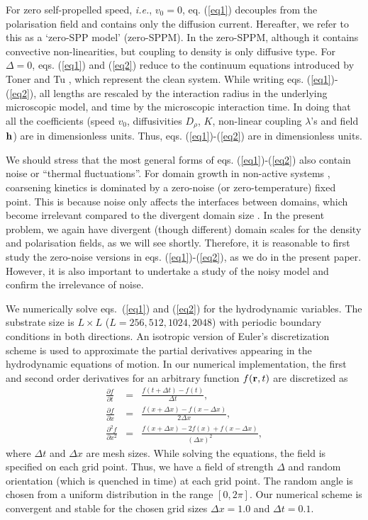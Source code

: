 \documentclass[pre,twocolumn,amssymb,showpacs,superscriptaddress,notitlepage]{revtex4-1}
\begin{document}
For zero self-propelled speed, {\it i.e.}, $v_0=0$, eq. (\ref{eq1}) decouples from the  polarisation field and 
contains only the diffusion current. Hereafter, we refer to this as a  `zero-SPP model' (zero-SPPM). In the zero-SPPM, 
although it contains convective non-linearities, but coupling to density is only diffusive type. 
For $\Delta=0$, eqs. (\ref{eq1}) and (\ref{eq2}) reduce to the continuum equations introduced by Toner and Tu \cite{tonertu}, 
which represent the clean system.  While writing eqs. (\ref{eq1})-(\ref{eq2}), all lengths are rescaled by the interaction 
radius in the underlying microscopic model, and time by the microscopic interaction time.  In doing that all the coefficients 
(speed $v_0$, diffusivities $D_{\rho}$, $K$, non-linear coupling $\lambda$'s 
and field ${\bf h}$) are in  dimensionless units. 
Thus, eqs. (\ref{eq1})-(\ref{eq2}) are in
dimensionless units.

We should stress that the most general forms of eqs. (\ref{eq1})-(\ref{eq2}) also contain noise or ``thermal fluctuations''. 
For domain growth in non-active systems \cite{ajbray1994,puribook}, coarsening kinetics is dominated by a zero-noise (or zero-temperature) fixed point. This is because noise only affects the interfaces between domains, which become irrelevant compared to the divergent domain size \cite{po88}. In the present problem, we again have divergent (though different) domain scales for the density and polarisation fields, as we will see shortly. Therefore, it is reasonable to first study the zero-noise versions in eqs. (\ref{eq1})-(\ref{eq2}), as we do in the present paper. However, it is also important to undertake a study of the noisy model and confirm the irrelevance of noise.


We numerically solve eqs.~(\ref{eq1}) and (\ref{eq2}) for the hydrodynamic variables. The substrate size is $L \times L$ ($L=256, 512, 1024, 2048$) with periodic boundary conditions in both directions. An isotropic version of Euler's discretization scheme is used to approximate the partial derivatives appearing in the hydrodynamic equations of motion. In our numerical implementation, the first and second order derivatives for an arbitrary function $f({\bf r},t)$ are discretized as
\begin{eqnarray}
\frac{\partial f}{\partial t} &=& \frac{f(t+\Delta t)-f(t)}{\Delta t} ,\nonumber \\
\frac{\partial f}{\partial x} &=& \frac{f(x+\Delta x)-f(x-\Delta x)}{ 2 \Delta x}, \nonumber \\
\frac{\partial^2 f}{\partial x^2} &=& \frac{f(x+\Delta x)-2 f(x) + f(x-\Delta x)}{(\Delta x)^2},
\end{eqnarray}
where $\Delta t$ and $\Delta x$ are mesh sizes. While solving the equations, the field is specified on each grid point. Thus, we have a field of strength $\Delta$ and random orientation (which is quenched in time) at each grid point. The random angle is chosen from a uniform distribution in the range $[0, 2\pi]$. Our numerical scheme is convergent and stable for the chosen grid sizes $\Delta x =1.0$ and $\Delta t =0.1$.
\end{document}
